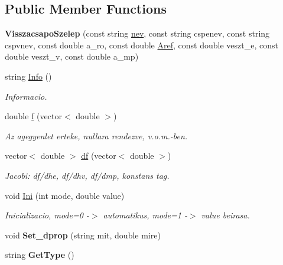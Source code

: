 \subsection*{Public Member Functions}
\begin{DoxyCompactItemize}
\item 
\hypertarget{class_visszacsapo_szelep_a40da5edbf8243f70eedb5891a0cd6b19}{}\label{class_visszacsapo_szelep_a40da5edbf8243f70eedb5891a0cd6b19} 
{\bfseries Visszacsapo\+Szelep} (const string \hyperlink{class_agelem_abe92b7e3912367d5d1caf6b277ca0b7d}{nev}, const string cspenev, const string cspvnev, const double a\+\_\+ro, const double \hyperlink{class_agelem_a3f8668febc2958fd539997d537552f17}{Aref}, const double veszt\+\_\+e, const double veszt\+\_\+v, const double a\+\_\+mp)
\item 
\hypertarget{class_visszacsapo_szelep_ae4304110869247cb1d1428c366553665}{}\label{class_visszacsapo_szelep_ae4304110869247cb1d1428c366553665} 
string \hyperlink{class_visszacsapo_szelep_ae4304110869247cb1d1428c366553665}{Info} ()
\begin{DoxyCompactList}\small\item\em Informacio. \end{DoxyCompactList}\item 
\hypertarget{class_visszacsapo_szelep_aa148976fb3ca2ab3d35c255dcc83c947}{}\label{class_visszacsapo_szelep_aa148976fb3ca2ab3d35c255dcc83c947} 
double \hyperlink{class_visszacsapo_szelep_aa148976fb3ca2ab3d35c255dcc83c947}{f} (vector$<$ double $>$)
\begin{DoxyCompactList}\small\item\em Az agegyenlet erteke, nullara rendezve, v.\+o.\+m.-\/ben. \end{DoxyCompactList}\item 
\hypertarget{class_visszacsapo_szelep_a9925c2e8f958d4d5707dd563f9d3ff31}{}\label{class_visszacsapo_szelep_a9925c2e8f958d4d5707dd563f9d3ff31} 
vector$<$ double $>$ \hyperlink{class_visszacsapo_szelep_a9925c2e8f958d4d5707dd563f9d3ff31}{df} (vector$<$ double $>$)
\begin{DoxyCompactList}\small\item\em Jacobi\+: df/dhe, df/dhv, df/dmp, konstans tag. \end{DoxyCompactList}\item 
\hypertarget{class_visszacsapo_szelep_a3473fbea667f172b09beae228c730e4f}{}\label{class_visszacsapo_szelep_a3473fbea667f172b09beae228c730e4f} 
void \hyperlink{class_visszacsapo_szelep_a3473fbea667f172b09beae228c730e4f}{Ini} (int mode, double value)
\begin{DoxyCompactList}\small\item\em Inicializacio, mode=0 -\/$>$ automatikus, mode=1 -\/$>$ value beirasa. \end{DoxyCompactList}\item 
\hypertarget{class_visszacsapo_szelep_a926e1eca26c657b4a7c2a6ac90c78729}{}\label{class_visszacsapo_szelep_a926e1eca26c657b4a7c2a6ac90c78729} 
void {\bfseries Set\+\_\+dprop} (string mit, double mire)
\item 
\hypertarget{class_visszacsapo_szelep_aa30043b601103db38fec768e510c3ebe}{}\label{class_visszacsapo_szelep_aa30043b601103db38fec768e510c3ebe} 
string {\bfseries Get\+Type} ()
\end{DoxyCompactItemize}
